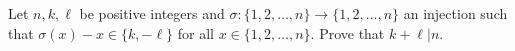 Let $n, k, \ell$ be positive integers and $\sigma : \lbrace 1, 2, \ldots, n \rbrace \rightarrow \lbrace 1, 2, \ldots, n \rbrace$ an injection such that $\sigma(x)-x\in \lbrace k, -\ell \rbrace$ for all $x\in \lbrace 1, 2, \ldots, n \rbrace$. Prove that $k+\ell|n$.